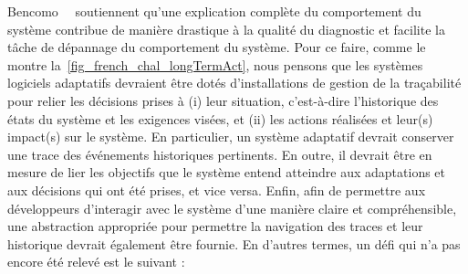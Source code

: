 Bencomo~\etal~\cite{DBLP:conf/iceccs/BencomoWSW12} soutiennent qu'une explication complète du comportement du système contribue de manière drastique à la qualité du diagnostic et facilite la tâche de dépannage du comportement du système. 
Pour ce faire, comme le montre la~\cref{fig_french_chal_longTermAct}, nous pensons que les systèmes logiciels adaptatifs devraient être dotés d'installations de gestion de la traçabilité pour relier les décisions prises à (i) leur  situation, c'est-à-dire l'historique des états du système et les exigences visées, et (ii) les actions réalisées et leur(s) impact(s) sur le système. 
En particulier, un système adaptatif devrait conserver une trace des événements historiques pertinents. 
En outre, il devrait être en mesure de lier les objectifs que le système entend atteindre aux adaptations et aux décisions qui ont été prises, et vice versa. 
Enfin, afin de permettre aux développeurs d'interagir avec le système d'une manière claire et compréhensible, une abstraction appropriée pour permettre la navigation des traces et leur historique devrait également être fournie. 
En d'autres termes, un défi qui n'a pas encore été relevé est le suivant :
\vspace{-2em}

